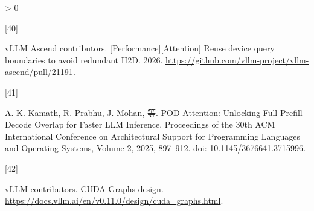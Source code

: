\documentclass[
  UTF8,
  zihao=5]{ctexart}
\newlength{\cslhangindent}
\newlength{\csllabelwidth}
\newenvironment{CSLReferences}[2] %
 {%
  \setlength{\parindent}{0pt}
  \ifodd #1 \everypar{\setlength{\hangindent}{\cslhangindent}}\ignorespaces\fi
  \ifnum #2 > 0
  \setlength{\parskip}{#2\baselineskip}
  \fi
 }%
 {}
\newcommand{\CSLLeftMargin}[1]{\parbox[t]{\csllabelwidth}{#1}}
\newcommand{\CSLRightInline}[1]{\parbox[t]{\linewidth - \csllabelwidth}{#1}\par}
\begin{document}
\begin{CSLReferences}{0}{0}
\leavevmode{}%
\CSLLeftMargin{{[}40{]} }%
\CSLRightInline{vLLM Ascend contributors.
{{[}Performance{]}{[}Attention{]} Reuse device query boundaries to avoid
redundant H2D}. 2026.
\url{https://github.com/vllm-project/vllm-ascend/pull/21191}.}

\leavevmode{}%
\CSLLeftMargin{{[}41{]} }%
\CSLRightInline{A. K. Kamath, R. Prabhu, J. Mohan, 等. {POD-Attention:
Unlocking Full Prefill-Decode Overlap for Faster LLM Inference}.
Proceedings of the 30th ACM International Conference on Architectural
Support for Programming Languages and Operating Systems, Volume 2, 2025,
897--912. doi:
\href{https://doi.org/10.1145/3676641.3715996}{10.1145/3676641.3715996}.}

\leavevmode{}%
\CSLLeftMargin{{[}42{]} }%
\CSLRightInline{vLLM contributors. {CUDA Graphs design}.
\url{https://docs.vllm.ai/en/v0.11.0/design/cuda_graphs.html}.}

\end{CSLReferences}
\end{document}

